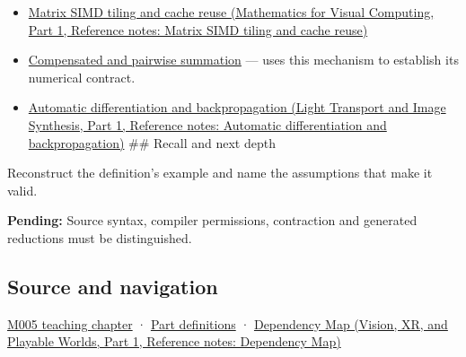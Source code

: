 \hypertarget{appendix-c2ac4a84c283-used-by}{}

\begin{itemize}
\item
  \href{../02-Mathematics-for-Visual-Computing-P01/main.pdf\#nameddest=appendix-1bfb7c657105}{Matrix SIMD tiling and cache reuse (Mathematics for Visual Computing, Part 1, Reference notes: Matrix SIMD tiling and cache reuse)}
\item
  \hyperref[appendix-df318da57389]{Compensated and pairwise summation} --- uses this mechanism to establish its numerical contract.
\item
  \href{../04-Light-Transport-and-Image-Synthesis-P01/main.pdf\#nameddest=appendix-40df0855b4a7}{Automatic differentiation and backpropagation (Light Transport and Image Synthesis, Part 1, Reference notes: Automatic differentiation and backpropagation)} \#\# Recall and next depth
\end{itemize}

Reconstruct the definition's example and name the assumptions that make it valid.

\textbf{Pending:} Source syntax, compiler permissions, contraction and generated reductions must be distinguished.

\subsection{Source and navigation}\label{appendix-c2ac4a84c283-source-and-navigation}

\hypertarget{appendix-c2ac4a84c283-source-and-navigation}{}

\hyperref[01-foundations-i-ch001-when-arithmetic-meets-uncertainty]{M005 teaching chapter} · \hyperref[appendix-fd090d982a15-m005---parts-77-88]{Part definitions} · \href{../07-Vision-XR-and-Playable-Worlds-P01/main.pdf\#nameddest=appendix-4ad47bdd269a}{Dependency Map (Vision, XR, and Playable Worlds, Part 1, Reference notes: Dependency Map)}

